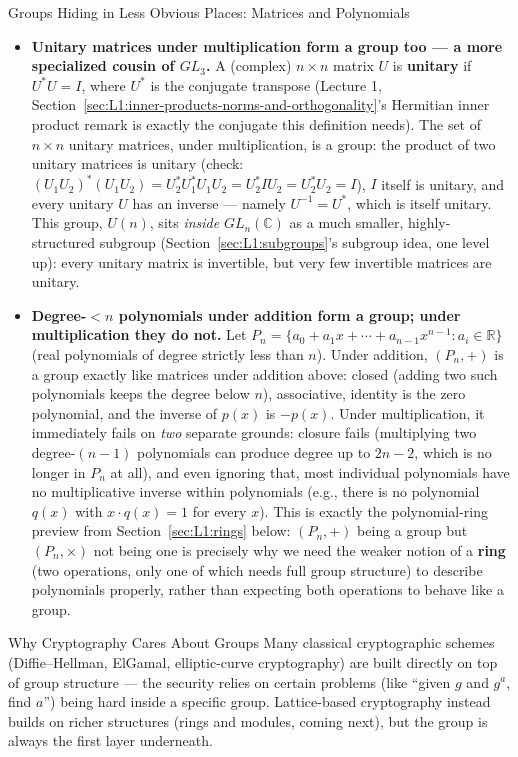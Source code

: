\begin{exbox}{Groups Hiding in Less Obvious Places: Matrices and Polynomials}
\begin{itemize}[leftmargin=*]
  \item \textbf{Unitary matrices under multiplication form a group too --- a more specialized cousin of $GL_3$.} A (complex) $n\times n$ matrix $U$ is \textbf{unitary} if $U^*U = I$, where $U^*$ is the conjugate transpose (Lecture 1, Section~\ref{sec:L1:inner-products-norms-and-orthogonality}'s Hermitian inner product remark is exactly the conjugate this definition needs). The set of $n\times n$ unitary matrices, under multiplication, is a group: the product of two unitary matrices is unitary (check: $(U_1U_2)^*(U_1U_2) = U_2^*U_1^*U_1U_2 = U_2^*IU_2=U_2^*U_2=I$), $I$ itself is unitary, and every unitary $U$ has an inverse --- namely $U^{-1}=U^*$, which is itself unitary. This group, $U(n)$, sits \emph{inside} $GL_n(\mathbb{C})$ as a much smaller, highly-structured subgroup (Section~\ref{sec:L1:subgroups}'s subgroup idea, one level up): every unitary matrix is invertible, but very few invertible matrices are unitary.
  \item \textbf{Degree-$<n$ polynomials under addition form a group; under multiplication they do not.} Let $P_n = \{a_0+a_1x+\cdots+a_{n-1}x^{n-1} : a_i \in \mathbb{R}\}$ (real polynomials of degree strictly less than $n$). Under addition, $(P_n,+)$ is a group exactly like matrices under addition above: closed (adding two such polynomials keeps the degree below $n$), associative, identity is the zero polynomial, and the inverse of $p(x)$ is $-p(x)$. Under multiplication, it immediately fails on \emph{two} separate grounds: closure fails (multiplying two degree-$(n-1)$ polynomials can produce degree up to $2n-2$, which is no longer in $P_n$ at all), and even ignoring that, most individual polynomials have no multiplicative inverse within polynomials (e.g., there is no polynomial $q(x)$ with $x\cdot q(x) = 1$ for every $x$). This is exactly the polynomial-ring preview from Section~\ref{sec:L1:rings} below: $(P_n,+)$ being a group but $(P_n,\times)$ not being one is precisely why we need the weaker notion of a \textbf{ring} (two operations, only one of which needs full group structure) to describe polynomials properly, rather than expecting both operations to behave like a group.
\end{itemize}
\end{exbox}

\begin{rmkbox}{Why Cryptography Cares About Groups}
Many classical cryptographic schemes (Diffie--Hellman, ElGamal, elliptic-curve cryptography) are built directly on top of group structure --- the security relies on certain problems (like ``given $g$ and $g^a$, find $a$'') being hard inside a specific group. Lattice-based cryptography instead builds on richer structures (rings and modules, coming next), but the group is always the first layer underneath.
\end{rmkbox}

